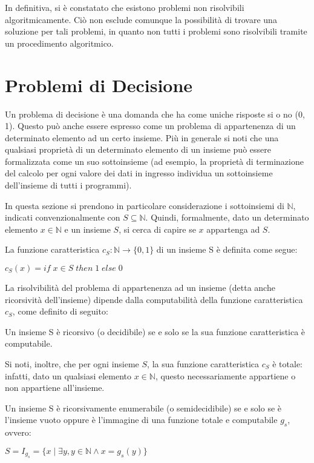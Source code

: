   In definitiva, si è constatato che esistono problemi non risolvibili algoritmicamente. Ciò non esclude comunque la possibilità di trovare una soluzione per tali problemi, in quanto non tutti i problemi sono risolvibili tramite un procedimento algoritmico. 

  \section{Problemi di Decisione}
  Un problema di decisione è una domanda che ha come uniche risposte si o no (0, 1). Questo può anche essere espresso come un problema di appartenenza di un determinato elemento ad un certo insieme. Più in generale si noti che una qualsiasi proprietà di un determinato elemento di un insieme può essere formalizzata come un suo sottoinsieme (ad esempio, la proprietà di terminazione del calcolo per ogni valore dei dati in ingresso individua un sottoinsieme dell'insieme di tutti i programmi). 
  
  In questa sezione si prendono in particolare considerazione i sottoinsiemi di \(\mathbb N\), indicati convenzionalmente con \(S\subseteq\mathbb{N}\). Quindi, formalmente, dato un determinato elemento \(x\in\mathbb{N}\) e un insieme \(S\), si cerca di capire se \(x\) appartenga ad \(S\).

  \begin{definition}
    La funzione caratteristica \(c_S:\mathbb{N}\to\{0,1\}\) di un insieme S è definita come segue:

    \(c_S(x)=if\;x\in S\;then\;1\;else\;0\)
  \end{definition}

  La risolvibilità del problema di appartenenza ad un insieme (detta anche ricorsività dell'insieme) dipende dalla computabilità della funzione caratteristica \(c_S\), come definito di seguito:

  \begin{definition}
    Un insieme S è ricorsivo (o decidibile) se e solo se la sua funzione caratteristica è computabile.
  \end{definition}

  Si noti, inoltre, che per ogni insieme \(S\), la sua funzione caratteristica \(c_S\) è totale: infatti, dato un qualsiasi elemento \(x\in\mathbb{N}\), questo necessariamente appartiene o non appartiene all'insieme.
  
  \begin{definition}
    Un insieme S è ricorsivamente enumerabile (o semidecidibile) se e solo se è l'insieme vuoto oppure è l'immagine di una funzione totale e computabile \(g_s\), ovvero:

    \(S=I_{g_s} = \{x\;|\;\exists y, y\in\mathbb{N} \land x=g_s(y)\}\)
  \end{definition}

